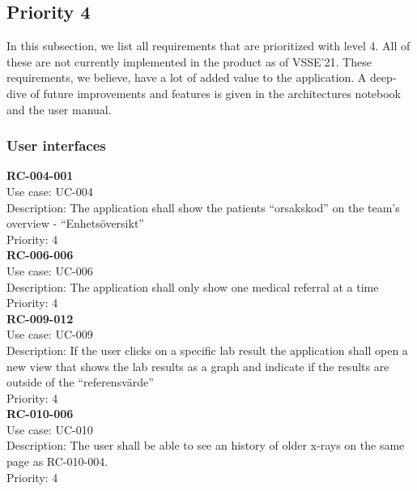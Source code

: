 \subsection{Priority 4}
In this subsection, we list all requirements that are prioritized with level 4. All of these are not currently implemented in the product as of VSSE'21. These requirements, we believe, have a lot of added value to the application. A deep-dive of future improvements and features is given in the architectures notebook and the user manual. 
\subsubsection{User interfaces}
\textbf{RC-004-001} \\
Use case: UC-004 \\
Description: The application shall show the patients “orsakskod” on the team’s overview - “Enhetsöversikt” \\
Priority: 4 \\
\newline
\textbf{RC-006-006} \\
Use case: UC-006 \\
Description: The application shall only show one medical referral at a time \\
Priority: 4 \\
\newline
\textbf{RC-009-012} \\
Use case: UC-009 \\
Description: If the user clicks on a specific lab result the application shall open a new view that shows the lab results as a graph and indicate if the results are outside of the “referensvärde” \\
Priority: 4 \\
\newline
\textbf{RC-010-006} \\
Use case: UC-010 \\
Description: The user shall be able to see an history of older x-rays on the same page as RC-010-004. \\
Priority: 4 \\
\newline
